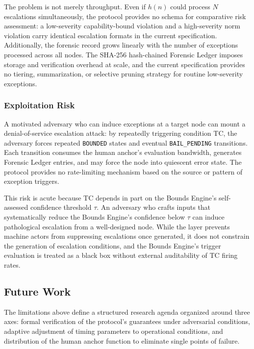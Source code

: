 The problem is not merely throughput. Even if $h(n)$ could process $N$ escalations simultaneously, the protocol provides no schema for comparative risk assessment: a low-severity capability-bound violation and a high-severity norm violation carry identical escalation formats in the current specification. Additionally, the forensic record grows linearly with the number of exceptions processed across all nodes. The SHA-256 hash-chained Forensic Ledger imposes storage and verification overhead at scale, and the current specification provides no tiering, summarization, or selective pruning strategy for routine low-severity exceptions.

\subsubsection{Exploitation Risk}
\label{sec:lim:exploitation}

A motivated adversary who can induce exceptions at a target \bxthree{} node can mount a denial-of-service escalation attack: by repeatedly triggering condition TC, the adversary forces repeated \texttt{BOUNDED} states and eventual \texttt{BAIL\_PENDING} transitions. Each transition consumes the human anchor's evaluation bandwidth, generates Forensic Ledger entries, and may force the node into quiescent error state. The protocol provides no rate-limiting mechanism based on the source or pattern of exception triggers.

This risk is acute because TC depends in part on the Bounds Engine's self-assessed confidence threshold $\tau$. An adversary who crafts inputs that systematically reduce the Bounds Engine's confidence below $\tau$ can induce pathological escalation from a well-designed node. While the \fact{} layer prevents machine actors from suppressing escalations once generated, it does not constrain the generation of escalation conditions, and the Bounds Engine's trigger evaluation is treated as a black box without external auditability of TC firing rates.

\subsection{Future Work}\label{sec:future-work}

The limitations above define a structured research agenda organized around three axes: formal verification of the protocol's guarantees under adversarial conditions, adaptive adjustment of timing parameters to operational conditions, and distribution of the human anchor function to eliminate single points of failure.

